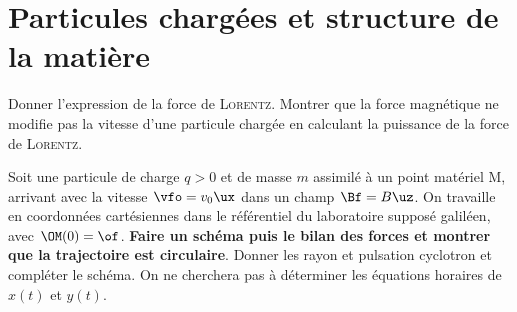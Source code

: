 \documentclass[a4paper, 10pt, final, garamond]{book}
\begin{document}
\setcounter{chapter}{17}


\chapter{Particules chargées et structure de la matière}

\begin{enumerate}[label=\sqenumi]
	Donner l'expression de la force de \textsc{Lorentz}. Montrer que la force
	magnétique ne modifie pas la vitesse d'une particule chargée en calculant la
	puissance de la force de \textsc{Lorentz}.
	\smallbreak
	\vspace{-15pt}
	\psw{
		\[
			\Ff \stm{=} q \left( \Ef + \vf \wedge \Bf \right)
			\Ra
			\Pc(\Ff) = q \left( \Ef + \vf \wedge \Bf \right)\cdot \vf
			= q\Ef\cdot\vf +
			q\underbracket[1pt]{\underbracket[1pt]{\vf\wedge\Bf}_{\perp\vf}\cdot\vf}_{=0}
			\Lra
			\boxed{\Pc(\Ff) \stm[-1]{=} q\Ef\cdot\vf} \stm{=} \dv{\Ec_c}{t}
		\]
	}
	\vspace{-15pt}
	\noindent
	\begin{minipage}[t]{.70\linewidth}
		Soit une particule de charge $q > 0$ et de masse $m$ assimilé à un point
		matériel M, arrivant avec la vitesse $\vfo = v_0\ux$ dans un champ $\Bf =
			B\uz$. On travaille en coordonnées cartésiennes dans le référentiel du
		laboratoire supposé galiléen, avec $\OM(0) = \of$. \textbf{Faire un schéma
			puis le bilan des forces et montrer que la trajectoire est circulaire}.
		Donner les rayon et pulsation cyclotron et compléter le schéma. On ne
		cherchera pas à déterminer les équations horaires de $x(t)$ et $y(t)$.
	\end{minipage}
	\hfill
	\begin{minipage}[t]{.28\linewidth}
		\vspace{-20pt}
		\begin{center}
\end{center}
\end{minipage}
\end{enumerate}
\end{document}

